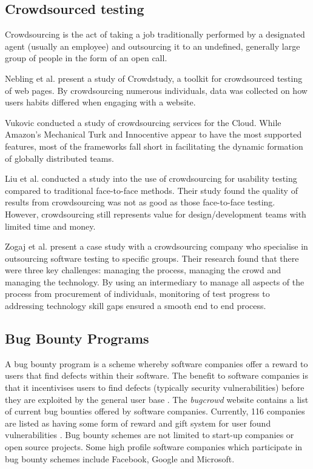\subsection{Crowdsourced testing}

Crowdsourcing is the act of taking a job traditionally performed by a designated agent (usually an employee) and outsourcing it to an undefined, generally large group of people in the form of an open call\cite{crowdsourcedef}.

Nebling et al. \cite{nebeling2012crowdsourced} present a study of Crowdstudy, a toolkit for crowdsourced testing of web pages. By crowdsourcing numerous individuals, data was collected on how users habits differed when engaging with a website. 

Vukovic \cite{Vukovic2009crowdsourcing} conducted a study of crowdsourcing services for the Cloud. While Amazon's Mechanical Turk and Innocentive appear to have the most supported features, most of the frameworks fall short in facilitating the dynamic formation of globally distributed teams. 

Liu et al. \cite{liu2012crowdsourcing} conducted a study into the use of crowdsourcing for usability testing compared to traditional face-to-face methods. Their study found the quality of results from crowdsourcing was not as good as those face-to-face testing. However, crowdsourcing still represents value for design/development teams with limited time and money.

Zogaj et al. \cite{zogaj2014managing} present a case study with a crowdsourcing company who specialise in outsourcing software testing to specific groups. Their research found that there were three key challenges: managing the process, managing the crowd and managing the technology. By using an intermediary to manage all aspects of the process from procurement of individuals, monitoring of test progress to addressing technology skill gaps ensured a smooth end to end process. 

\subsection{Bug Bounty Programs}

A bug bounty program is a scheme whereby software companies offer a reward to users that find defects within their software. The benefit to software companies is that it incentivises users to find defects (typically security vulnerabilities) before they are exploited by the general user base \cite{wiki2015bugbounty}. The \emph{bugcrowd} website contains a list of current bug bounties offered by software companies.  Currently, 116 companies are listed as having some form of reward and gift system for user found vulnerabilities \cite{bugcrowd2015}. Bug bounty schemes are not limited to start-up companies or open source projects.  Some high profile software companies which participate in bug bounty schemes include Facebook, Google and Microsoft. \par

